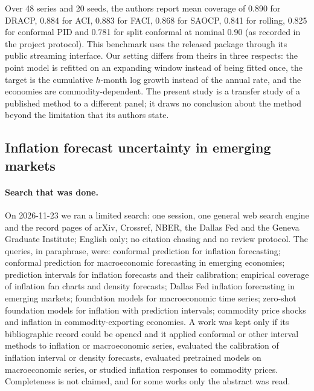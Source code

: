 Over 48 series and 20 seeds, the authors report mean coverage of 0.890 for DRACP, 0.884 for ACI, 0.883 for FACI, 0.868 for SAOCP, 0.841 for rolling, 0.825 for conformal PID and 0.781 for split conformal at nominal 0.90 (as recorded in the project protocol). This benchmark uses the released package through its public streaming interface. Our setting differs from theirs in three respects: the point model is refitted on an expanding window instead of being fitted once, the target is the cumulative $h$-month log growth instead of the annual rate, and the economies are commodity-dependent. The present study is a transfer study of a published method to a different panel; it draws no conclusion about the method beyond the limitation that its authors state.

\subsection{Inflation forecast uncertainty in emerging markets}

\paragraph{Search that was done.} On 2026-11-23 we ran a limited search: one session, one general web search engine and the record pages of arXiv, Crossref, NBER, the Dallas Fed and the Geneva Graduate Institute; English only; no citation chasing and no review protocol. The queries, in paraphrase, were: conformal prediction for inflation forecasting; conformal prediction for macroeconomic forecasting in emerging economies; prediction intervals for inflation forecasts and their calibration; empirical coverage of inflation fan charts and density forecasts; Dallas Fed inflation forecasting in emerging markets; foundation models for macroeconomic time series; zero-shot foundation models for inflation with prediction intervals; commodity price shocks and inflation in commodity-exporting economies. A work was kept only if its bibliographic record could be opened and it applied conformal or other interval methods to inflation or macroeconomic series, evaluated the calibration of inflation interval or density forecasts, evaluated pretrained models on macroeconomic series, or studied inflation responses to commodity prices. Completeness is not claimed, and for some works only the abstract was read.

